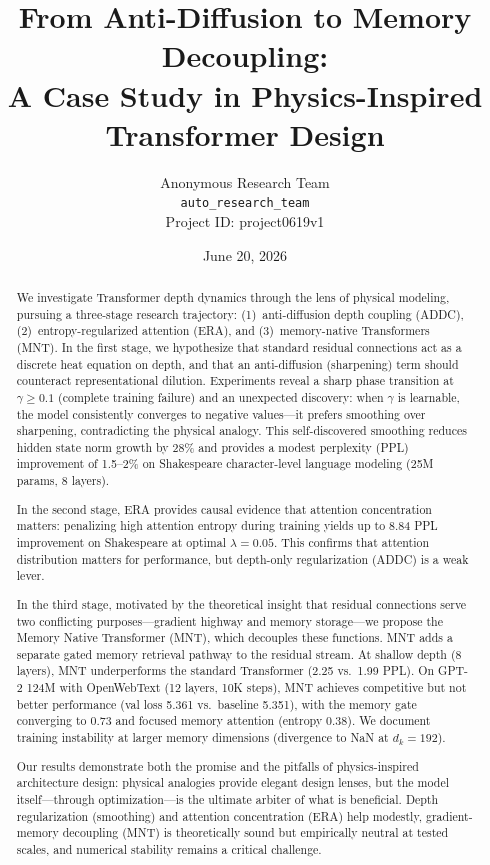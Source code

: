 \documentclass[10pt]{article}
\title{\Large\bf From Anti-Diffusion to Memory Decoupling:\\
A Case Study in Physics-Inspired Transformer Design}
\author{Anonymous Research Team\\
\texttt{auto\_research\_team}\\
Project ID: project0619v1}
\date{June 20, 2026}
\begin{document}
\maketitle

\begin{abstract}
We investigate Transformer depth dynamics through the lens of physical modeling, pursuing a three-stage research trajectory: (1)~anti-diffusion depth coupling (ADDC), (2)~entropy-regularized attention (ERA), and (3)~memory-native Transformers (MNT). In the first stage, we hypothesize that standard residual connections act as a discrete heat equation on depth, and that an anti-diffusion (sharpening) term should counteract representational dilution. Experiments reveal a sharp phase transition at $\gamma \geq 0.1$ (complete training failure) and an unexpected discovery: when $\gamma$ is learnable, the model consistently converges to negative values---it prefers smoothing over sharpening, contradicting the physical analogy. This self-discovered smoothing reduces hidden state norm growth by 28\% and provides a modest perplexity (PPL) improvement of 1.5--2\% on Shakespeare character-level language modeling (25M params, 8 layers).

In the second stage, ERA provides causal evidence that attention concentration matters: penalizing high attention entropy during training yields up to 8.84 PPL improvement on Shakespeare at optimal $\lambda=0.05$. This confirms that attention distribution matters for performance, but depth-only regularization (ADDC) is a weak lever.

In the third stage, motivated by the theoretical insight that residual connections serve two conflicting purposes---gradient highway and memory storage---we propose the Memory Native Transformer (MNT), which decouples these functions. MNT adds a separate gated memory retrieval pathway to the residual stream. At shallow depth (8 layers), MNT underperforms the standard Transformer (2.25 vs.\ 1.99 PPL). On GPT-2 124M with OpenWebText (12 layers, 10K steps), MNT achieves competitive but not better performance (val loss 5.361 vs.\ baseline 5.351), with the memory gate converging to 0.73 and focused memory attention (entropy 0.38). We document training instability at larger memory dimensions (divergence to NaN at $d_k=192$).

Our results demonstrate both the promise and the pitfalls of physics-inspired architecture design: physical analogies provide elegant design lenses, but the model itself---through optimization---is the ultimate arbiter of what is beneficial. Depth regularization (smoothing) and attention concentration (ERA) help modestly, gradient-memory decoupling (MNT) is theoretically sound but empirically neutral at tested scales, and numerical stability remains a critical challenge.
\end{abstract}
\end{document}
